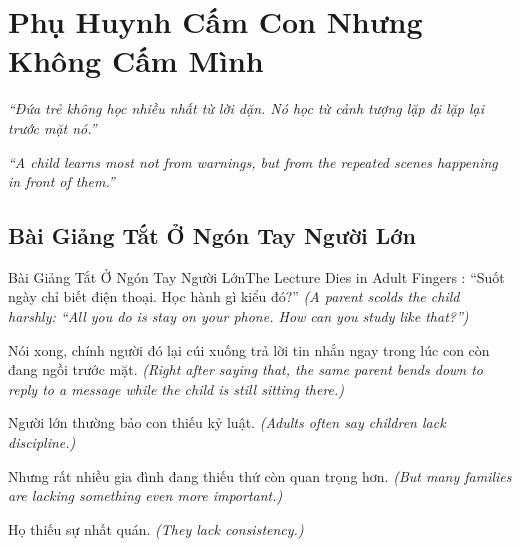 \chapter{Phụ Huynh Cấm Con Nhưng Không Cấm Mình}

\begin{center}
	\textit{\color{bookprimary}``Đứa trẻ không học nhiều nhất từ lời dặn. Nó học từ cảnh tượng lặp đi lặp lại trước mặt nó.''}

	\textit{\color{bookprimary}``A child learns most not from warnings, but from the repeated scenes happening in front of them.''}
\end{center}

\ngancach

\section{Bài Giảng Tắt Ở Ngón Tay Người Lớn}
\begin{truyen}{Bài Giảng Tắt Ở Ngón Tay Người Lớn}{The Lecture Dies in Adult Fingers}
: ``Suốt ngày chỉ biết điện thoại. Học hành gì kiểu đó?''
\textit{(A parent scolds the child harshly: ``All you do is stay on your phone. How can you study like that?'')}

Nói xong, chính người đó lại cúi xuống trả lời tin nhắn ngay trong lúc con còn đang ngồi trước mặt.
\textit{(Right after saying that, the same parent bends down to reply to a message while the child is still sitting there.)}


Người lớn thường bảo con thiếu kỷ luật.
\textit{(Adults often say children lack discipline.)}

Nhưng rất nhiều gia đình đang thiếu thứ còn quan trọng hơn.
\textit{(But many families are lacking something even more important.)}

Họ thiếu sự nhất quán.
\textit{(They lack consistency.)}
\end{truyen}

